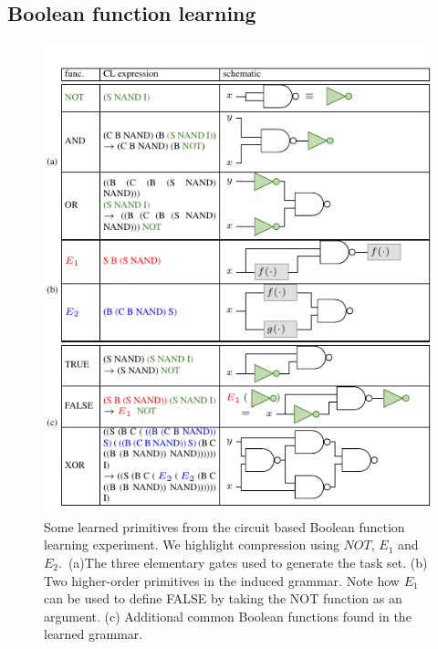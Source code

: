 \documentclass{article}
\begin{document}


\subsection{Boolean function learning}
\label{sec:boolcircuits}

\begin{figure}[t]
\includegraphics{./figures/tablealonedoc.pdf}
\caption{Some learned primitives from the circuit based Boolean
  function learning experiment. We highlight compression using $NOT$,
  $E_1$ and $E_2$. \,(a)The three elementary gates used to generate
  the task set. (b) Two higher-order primitives in the induced
  grammar. Note how $E_1$ can be used to define FALSE by taking the
  NOT function as an argument. (c) Additional common Boolean functions
  found in the learned grammar.  \label{table:booleanCircuits}}
\end{figure}
\end{document}
